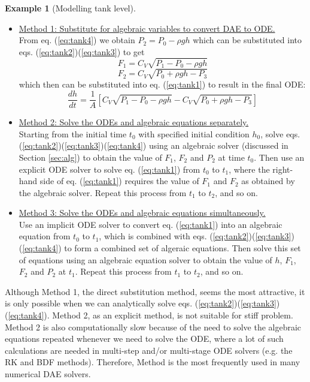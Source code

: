 \documentclass[a4paper,11pt]{article}
\theoremstyle{definition}
\newtheorem{exmp}{Example}[section]
\begin{document}
\begin{exmp}[Modelling tank level]
\begin{itemize}
	\item \underline{Method 1: Substitute for algebraic variables to convert DAE to ODE.}\\
		From eq. (\ref{eq:tank4}) we obtain $P_2 = P_0 - \rho g h$ which can be
		substituted into eqs. (\ref{eq:tank2})(\ref{eq:tank3}) to get
		\[ F_1 = C_V \sqrt{P_1 - P_0 - \rho g h} \]
		\[ F_2 = C_V \sqrt{P_0 + \rho g h - P_3} \]
		which then can be substituted into eq. (\ref{eq:tank1}) to result in the final ODE:
		\begin{equation}
			\frac{d h}{d t} = \frac{1}{A} \left[ C_V \sqrt{P_1 - P_0 - \rho g h} - C_V \sqrt{P_0 + \rho g h - P_3} \right]
		\end{equation}
	\item \underline{Method 2: Solve the ODEs and algebraic equations separately.} \\
		Starting from the initial time $t_0$ with specified initial condition $h_0$,
		solve eqs. (\ref{eq:tank2})(\ref{eq:tank3})(\ref{eq:tank4}) using an algebraic solver
			(discussed in Section \ref{sec:alg}) to obtain the value of $F_1$, $F_2$ and $P_2$
			at time $t_0$. Then use an explicit ODE solver to solve eq. (\ref{eq:tank1}) from $t_0$ to $t_1$, where
			the right-hand side of eq. (\ref{eq:tank1})
			requires the value of $F_1$ and $F_2$ as obtained by the algebraic solver.
			Repeat this process from $t_1$ to $t_2$, and so on.
	\item \underline{Method 3: Solve the ODEs and algebraic equations simultaneously.} \\
		Use an implicit ODE solver to convert eq. (\ref{eq:tank1}) into an algebraic equation from $t_0$ to $t_1$,
		which is combined with eqs. (\ref{eq:tank2})(\ref{eq:tank3})(\ref{eq:tank4})
		to form a combined set of algeraic equations. Then solve this set of equations using an algebraic equation
		solver to obtain the value of $h$, $F_1$, $F_2$ and $P_2$ at $t_1$. Repeat this process from
		$t_1$ to $t_2$, and so on.
\end{itemize}

Although Method 1, the direct substitution method, seems the most attractive, it is only possible when
we can analytically solve eqs. (\ref{eq:tank2})(\ref{eq:tank3})(\ref{eq:tank4}). Method 2, as an explicit
method, is not suitable for stiff problem. Method 2 is also computationally slow because of the need to
solve the algebraic equations repeated whenever we need to solve the ODE, where a lot of such calculations
are needed in multi-step and/or multi-stage ODE solvers (e.g. the RK and BDF methods).
Therefore, Method is the most frequently used in many numerical DAE solvers.

\end{exmp}
\end{document}

